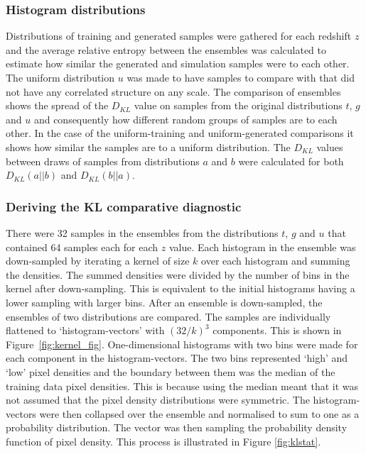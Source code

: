 \documentclass[twocolumn]{article}
\numberwithin{equation}{section}
\begin{document}

\subsubsection{Histogram distributions}
Distributions of training and generated samples were gathered for each redshift $z$ and the average relative entropy 
between the ensembles was calculated to estimate how similar the generated and simulation samples were to each other.
The uniform distribution $u$ was made to have samples to compare with that did not have any correlated structure on any 
scale. The comparison of ensembles shows the spread of the $D_{KL}$ value on samples from the original distributions $t$, 
$g$ and $u$ and consequently how different random groups of samples are to each other. In the case of the uniform-training 
and uniform-generated comparisons it shows how similar the samples are to a uniform distribution. The $D_{KL}$ values 
between draws of samples from distributions $a$ and $b$ were calculated for both $D_{KL}(a||b)$ and $D_{KL}(b||a)$. 


\subsubsection{Deriving the KL comparative diagnostic}
There were 32 samples in the ensembles from the distributions $t$, $g$ and $u$ that contained 64 samples each for each $z$ 
value. Each histogram in the ensemble was down-sampled by iterating a kernel of size $k$ over each histogram and summing 
the densities. The summed densities were divided by the number of bins in the kernel after down-sampling. This is equivalent 
to the initial histograms having a lower sampling with larger bins. After an ensemble is down-sampled, the ensembles of two 
distributions are compared. The samples are individually flattened to `histogram-vectors' with $(32/k)^3$ components. 
This is shown in Figure~\ref{fig:kernel_fig}. One-dimensional histograms with two bins were made for each component in the 
histogram-vectors. The two bins represented `high' and `low' pixel densities and the boundary between them was the median 
of the training data pixel densities. This is because using the median meant that it was not assumed that the pixel density 
distributions were symmetric. The histogram-vectors were then collapsed over the ensemble and normalised to sum to one as 
a probability distribution. The vector was then sampling the probability density function of pixel density. This process 
is illustrated in Figure \ref{fig:klstat}.
\end{document}
